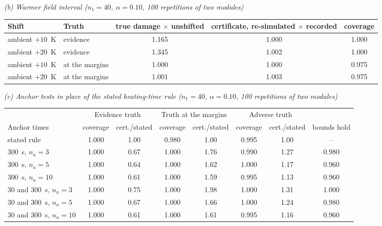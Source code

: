 \begin{table}[htbp]
\medskip
\textit{(b) Warmer field interval ($n_1=40$, $\alpha=0.10$, 100 repetitions of two modules)}\\[2pt]
\begin{tabular*}{\textwidth}{@{\extracolsep{\fill}}llccc@{}}
\toprule
Shift & Truth & \makecell{true damage\\$\times$ unshifted} & \makecell{certificate, re-simulated\\$\times$ recorded} &
coverage \\
\midrule
ambient $+10$~K & evidence & 1.165 & 1.000 & 1.000 \\
ambient $+20$~K & evidence & 1.345 & 1.002 & 1.000 \\
ambient $+10$~K & at the margins & 1.000 & 1.000 & 0.975 \\
ambient $+20$~K & at the margins & 1.001 & 1.003 & 0.975 \\
\bottomrule
\end{tabular*}

\medskip
\textit{(c) Anchor tests in place of the stated heating-time rule ($n_1=40$, $\alpha=0.10$, 100 repetitions of two
modules)}\\[2pt]
\begin{tabular*}{\textwidth}{@{\extracolsep{\fill}}lccccccc@{}}
\toprule
& \multicolumn{2}{c}{Evidence truth} & \multicolumn{2}{c}{Truth at the margins} & \multicolumn{2}{c}{Adverse truth} & \\
\cmidrule(lr){2-3}\cmidrule(lr){4-5}\cmidrule(lr){6-7}
Anchor times & coverage & cert./stated & coverage & cert./stated & coverage & cert./stated & bounds hold \\
\midrule
stated rule & 1.000 & 1.00 & 0.980 & 1.00 & 0.995 & 1.00 & -- \\
300~s, $n_a=3$ & 1.000 & 0.67 & 1.000 & 1.76 & 0.990 & 1.27 & 0.980 \\
300~s, $n_a=5$ & 1.000 & 0.64 & 1.000 & 1.62 & 1.000 & 1.17 & 0.960 \\
300~s, $n_a=10$ & 1.000 & 0.61 & 1.000 & 1.59 & 0.995 & 1.13 & 0.960 \\
30 and 300~s, $n_a=3$ & 1.000 & 0.75 & 1.000 & 1.98 & 1.000 & 1.31 & 1.000 \\
30 and 300~s, $n_a=5$ & 1.000 & 0.67 & 1.000 & 1.66 & 1.000 & 1.24 & 0.980 \\
30 and 300~s, $n_a=10$ & 1.000 & 0.61 & 1.000 & 1.61 & 0.995 & 1.16 & 0.960 \\
\bottomrule
\end{tabular*}


\end{table}
